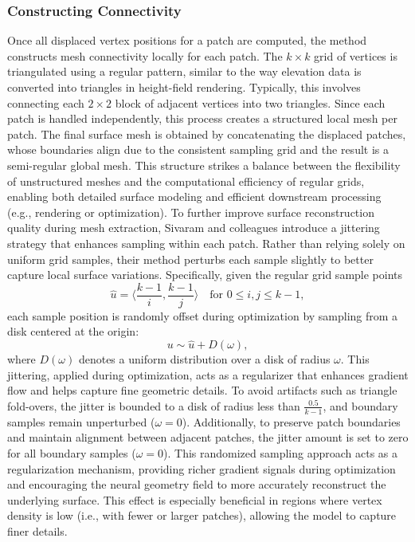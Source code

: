 \subsubsection{Constructing Connectivity}

Once all displaced vertex positions for a patch are computed, the method constructs mesh connectivity locally for each patch. 
The $k \times k$ grid of vertices is triangulated using a regular pattern, similar to the way elevation data is converted into triangles in height-field rendering. 
Typically, this involves connecting each $2 \times 2$ block of adjacent vertices into two triangles. 
Since each patch is handled independently, this process creates a structured local mesh per patch. 
The final surface mesh is obtained by concatenating the displaced patches, whose boundaries align due to the consistent sampling grid and the result is a semi-regular global mesh. 
This structure strikes a balance between the flexibility of unstructured meshes and the computational efficiency of regular grids, enabling both detailed surface modeling and efficient downstream processing (e.g., rendering or optimization). 
To further improve surface reconstruction quality during mesh extraction, Sivaram and colleagues introduce a jittering strategy that enhances sampling within each patch. 
Rather than relying solely on uniform grid samples, their method perturbs each sample slightly to better capture local surface variations. 
Specifically, given the regular grid sample points
\[\hat{u} = \langle \frac{k-1}{i}, \frac{k-1}{j} \rangle \quad \text{for } 0 \leq i,j \leq k-1,\]
each sample position is randomly offset during optimization by sampling from a disk centered at the origin: 
\[u \sim \hat{u} + D(\omega),\]
where \( D(\omega) \) denotes a uniform distribution over a disk of radius \( \omega \). 
This jittering, applied during optimization, acts as a regularizer that enhances gradient flow and helps capture fine geometric details. 
To avoid artifacts such as triangle fold-overs, the jitter is bounded to a disk of radius less than \( \frac{0.5}{k-1} \), and boundary samples remain unperturbed (\( \omega = 0 \)). 
Additionally, to preserve patch boundaries and maintain alignment between adjacent patches, the jitter amount is set to zero for all boundary samples (\( \omega = 0 \)). 
This randomized sampling approach acts as a regularization mechanism, providing richer gradient signals during optimization and encouraging the neural geometry field to more accurately reconstruct the underlying surface. 
This effect is especially beneficial in regions where vertex density is low (i.e., with fewer or larger patches), allowing the model to capture finer details. 
